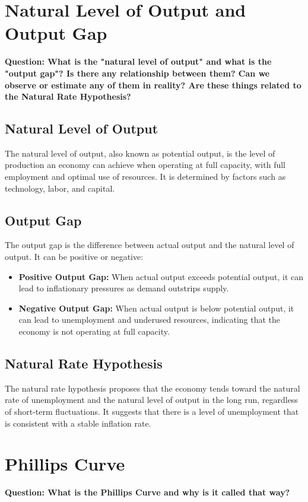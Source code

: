 \documentclass{article}
\begin{document}
\section{Natural Level of Output and Output Gap}
\textbf{Question: What is the "natural level of output" and what is the "output gap"? Is there any relationship between them? Can we observe or estimate any of them in reality? Are these things related to the Natural Rate Hypothesis?}

\subsection{Natural Level of Output}
The natural level of output, also known as potential output, is the level of production an economy can achieve when operating at full capacity, with full employment and optimal use of resources. It is determined by factors such as technology, labor, and capital.

\subsection{Output Gap}
The output gap is the difference between actual output and the natural level of output. It can be positive or negative:
\begin{itemize}
    \item \textbf{Positive Output Gap:} When actual output exceeds potential output, it can lead to inflationary pressures as demand outstrips supply.
    \item \textbf{Negative Output Gap:} When actual output is below potential output, it can lead to unemployment and underused resources, indicating that the economy is not operating at full capacity.
\end{itemize}

\subsection{Natural Rate Hypothesis}
The natural rate hypothesis proposes that the economy tends toward the natural rate of unemployment and the natural level of output in the long run, regardless of short-term fluctuations. It suggests that there is a level of unemployment that is consistent with a stable inflation rate.

\section{Phillips Curve}
\textbf{Question: What is the Phillips Curve and why is it called that way?}
\end{document}
